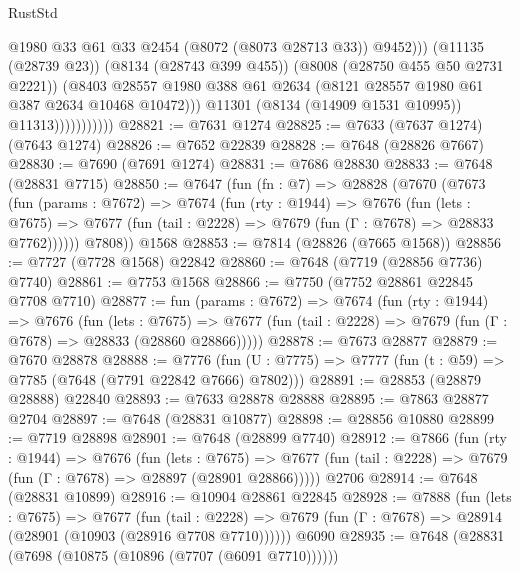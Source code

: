 \begin{lexlean}{RustStd}
\begin{coremodule}
                                  @1980
                                  @33
                                  @61
                                  @33
                                  @2454
                                  (@8072 (@8073 @28713 @33))
                                  @9452)))
                            (@11135 (@28739 @23))
                            (@8134 (@28743 @399 @455))
                            (@8008 (@28750 @455 @50 @2731 @2221))
                            (@8403
                              @28557
                              @1980
                              @388
                              @61
                              @2634
                              (@8121 @28557 @1980 @61 @387 @2634 @10468 @10472)))
                          @11301
                          (@8134 (@14909 @1531 @10995))
                          @11313)))))))))))
@28821 := @7631 @1274
@28825 := @7633 (@7637 @1274) (@7643 @1274)
@28826 := @7652 @22839
@28828 := @7648 (@28826 @7667)
@28830 := @7690 (@7691 @1274)
@28831 := @7686 @28830
@28833 := @7648 (@28831 @7715)
@28850 := @7647
    (fun (fn : @7) =>
    @28828
      (@7670
        (@7673
          (fun (params : @7672) =>
          @7674
            (fun (rty : @1944) =>
            @7676
              (fun (lets : @7675) =>
              @7677 (fun (tail : @2228) => @7679 (fun (Γ : @7678) => @28833 @7762))))))
        @7808))
    @1568
@28853 := @7814 (@28826 (@7665 @1568))
@28856 := @7727 (@7728 @1568) @22842
@28860 := @7648 (@7719 (@28856 @7736) @7740)
@28861 := @7753 @1568
@28866 := @7750 (@7752 @28861 @22845 @7708 @7710)
@28877 := fun (params : @7672) =>
  @7674
    (fun (rty : @1944) =>
    @7676
      (fun (lets : @7675) =>
      @7677 (fun (tail : @2228) => @7679 (fun (Γ : @7678) => @28833 (@28860 @28866)))))
@28878 := @7673 @28877
@28879 := @7670 @28878
@28888 := @7776
    (fun (U : @7775) => @7777 (fun (t : @59) => @7785 (@7648 (@7791 @22842 @7666) @7802)))
@28891 := @28853 (@28879 @28888) @22840
@28893 := @7633 @28878 @28888
@28895 := @7863 @28877 @2704
@28897 := @7648 (@28831 @10877)
@28898 := @28856 @10880
@28899 := @7719 @28898
@28901 := @7648 (@28899 @7740)
@28912 := @7866
    (fun (rty : @1944) =>
    @7676
      (fun (lets : @7675) =>
      @7677 (fun (tail : @2228) => @7679 (fun (Γ : @7678) => @28897 (@28901 @28866)))))
    @2706
@28914 := @7648 (@28831 @10899)
@28916 := @10904 @28861 @22845
@28928 := @7888
    (fun (lets : @7675) =>
    @7677
      (fun (tail : @2228) =>
      @7679 (fun (Γ : @7678) => @28914 (@28901 (@10903 (@28916 @7708 @7710))))))
    @6090
@28935 := @7648 (@28831 (@7698 (@10875 (@10896 (@7707 (@6091 @7710))))))

\end{coremodule}
\end{lexlean}
